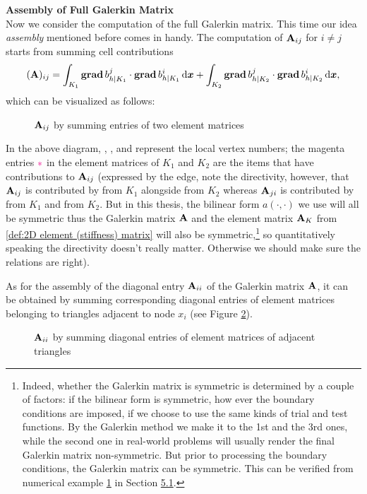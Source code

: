 	\noindent\textbf{Assembly of Full Galerkin Matrix}\\[8pt]	
	Now we consider the computation of the full Galerkin matrix. This time 
	our idea \emph{assembly} mentioned before comes in handy. The computation
	of $\mathbf{A}_{ij}$ for $i\neq j$ starts from summing cell contributions
	\[(\mathbf{A})_{ij}=
	\int_{K_1}\mathbf{grad}\, b_{h|K_1}^j\cdot\mathbf{grad}\, b_{h|K_1}^i\, \mathrm{d}\bm{x} +
	\int_{K_2}\mathbf{grad}\, b_{h|K_2}^j\cdot\mathbf{grad}\, b_{h|K_2}^i\, \mathrm{d}\bm{x}, \]
	which can be visualized as follows:	
	\begin{figure}[!htbp]
		\centering
		
		\caption{$\mathbf{A}_{ij}$ by summing entries of two element matrices}
		\label{tikz:2D_assemble_two_element_matrices}
	\end{figure}

	In the above diagram, , , and
	 represent the local vertex numbers; the magenta
	entries $\textcolor{magenta}{*}$ in the element matrices of $K_1$ and
	$K_2$ are the items that have contributions to $\mathbf{A}_{ij}$ 
	(expressed by the edge, note the directivity, however, that 
	$\mathbf{A}_{ij}$ is contributed by  
	from $K_1$ alongside  from $K_2$
	whereas $\mathbf{A}_{ji}$ is contributed by 
	 from $K_1$ and
 	 from $K_2$. But in this thesis, the
 	bilinear form $a(\cdot,\cdot)$ we use will all be symmetric thus the 
 	Galerkin matrix $\mathbf{A}$ and the element matrix $\mathbf{A}_K$ from 
 	\eqref{def:2D element (stiffness) matrix} will also be 
 	symmetric,\footnote{
 	Indeed, whether the Galerkin matrix is symmetric is determined by a couple 
 	of factors: if the bilinear form is symmetric, how ever the boundary 
 	conditions are imposed, if we choose to use the same kinds of 
 	trial and test functions. By the Galerkin method we make it to the 1st and 
 	the 3rd ones, while the second one in real-world problems will 
 	usually render the final Galerkin matrix non-symmetric. But prior to 
 	processing the boundary conditions, the Galerkin matrix can be symmetric.
 	This can be verified from numerical example \hyperref[code:example1]{1}
 	in Section \hyperref[subsection.5.1]{5.1}.
 	}
 	so quantitatively speaking the directivity doesn't 
 	really matter. Otherwise we should make sure the relations are right).
	
	As for the assembly of the diagonal entry $\mathbf{A}_{ii}$ of 
	the Galerkin matrix $\mathbf{A}$, it can be obtained by summing 
	corresponding diagonal entries of element matrices belonging to triangles 
	adjacent to node $x_i$ (see Figure 
	\ref{tikz:2D_assemble_diagonal_element_matrices}).
	\begin{figure}[!htbp]
		\centering
		
		\caption{$\mathbf{A}_{ii}$ by summing diagonal entries of element
			 matrices of adjacent triangles}
		\label{tikz:2D_assemble_diagonal_element_matrices}
	\end{figure}
	
